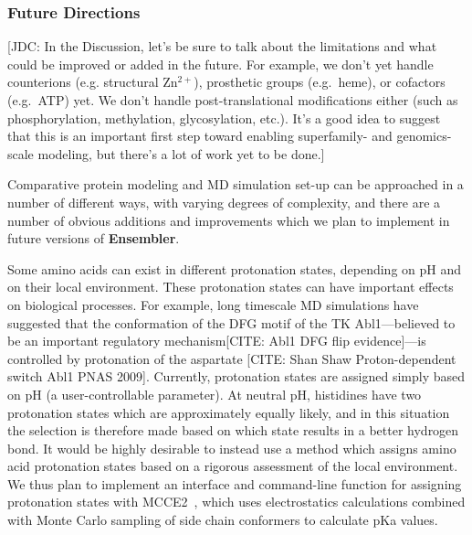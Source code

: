 \documentclass[aps,pre,twocolumn,nofootinbib,superscriptaddress,linenumbers]{revtex4-1}
\begin{document}
\subsubsection*{Future Directions}

{\color{red}[JDC: In the Discussion, let's be sure to talk about the limitations and what could be improved or added in the future.  For example, we don't yet handle counterions (e.g. structural Zn$^{2+}$), prosthetic groups (e.g.~heme), or cofactors (e.g.~ATP) yet.  We don't handle post-translational modifications either (such as phosphorylation, methylation, glycosylation, etc.).  It's a good idea to suggest that this is an important first step toward enabling superfamily- and genomics-scale modeling, but there's a lot of work yet to be done.]}

Comparative protein modeling and MD simulation set-up can be approached in a number of different ways, with varying degrees of complexity, and there are a number of obvious additions and improvements which we plan to implement in future versions of {\bf Ensembler}.

Some amino acids can exist in different protonation states, depending on pH and on their local environment.
These protonation states can have important effects on biological processes.
For example, long timescale MD simulations have suggested that the conformation of the DFG motif of the TK Abl1---believed to be an important regulatory mechanism[CITE: Abl1 DFG flip evidence]---is controlled by protonation of the aspartate [CITE: Shan Shaw Proton-dependent switch Abl1 PNAS 2009].
Currently, protonation states are assigned simply based on pH (a user-controllable parameter).
At neutral pH, histidines have two protonation states which are approximately equally likely, and in this situation the selection is therefore made based on which state results in a better hydrogen bond.
It would be highly desirable to instead use a method which assigns amino acid protonation states based on a rigorous assessment of the local environment.
We thus plan to implement an interface and command-line function for assigning protonation states with MCCE2~\cite{mcce2}, which uses electrostatics calculations combined with Monte Carlo sampling of side chain conformers to calculate pKa values.
\end{document}
